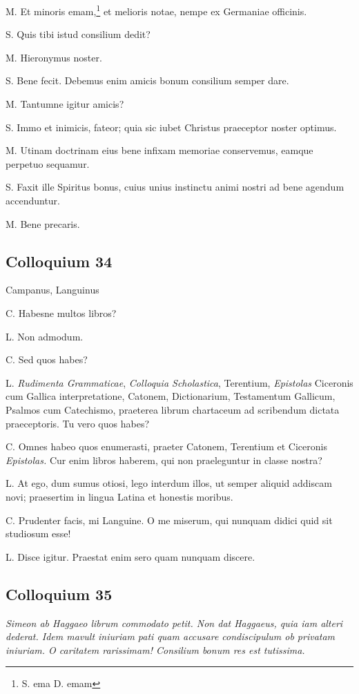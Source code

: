 \documentclass{article}
\begin{document}
M. Et minoris emam,\footnote{S. ema D. emam} et melioris notae, nempe ex Germaniae officinis.

S. Quis tibi istud consilium dedit?

M. Hieronymus noster.

S. Bene fecit. Debemus enim amicis bonum consilium semper dare.

M. Tantumne igitur amicis?

S. Immo et inimicis, fateor; quia sic iubet Christus praeceptor noster optimus.

M. Utinam doctrinam eius bene infixam memoriae conservemus, eamque perpetuo sequamur.

S. Faxit ille Spiritus bonus, cuius unius instinctu animi nostri ad bene agendum accenduntur.

M. Bene precaris.

\subsection{Colloquium 34}
Campanus, Languinus

C. Habesne multos libros?

L. Non admodum.

C. Sed quos habes?

L. \emph{Rudimenta Grammaticae}, \emph{Colloquia Scholastica}, Terentium, \emph{Epistolas} Ciceronis cum Gallica interpretatione, Catonem, Dictionarium, Testamentum Gallicum, Psalmos cum Catechismo, praeterea librum chartaceum ad scribendum dictata praeceptoris. Tu vero quos habes?

C. Omnes habeo quos enumerasti, praeter Catonem, Terentium et Ciceronis \emph{Epistolas.} Cur enim libros haberem, qui non praeleguntur in classe nostra?

L. At ego, dum sumus otiosi, lego interdum illos, ut semper aliquid addiscam novi; praesertim in lingua Latina et honestis moribus.

C. Prudenter facis, mi Languine. O me miserum, qui nunquam didici quid sit studiosum esse!

L. Disce igitur. Praestat enim sero quam nunquam discere.

\subsection{Colloquium 35}
\emph{Simeon ab Haggaeo librum commodato petit. Non dat Haggaeus, quia iam alteri dederat. Idem mavult iniuriam pati quam accusare condiscipulum ob privatam iniuriam. O caritatem rarissimam! Consilium bonum res est tutissima.}
\end{document}
